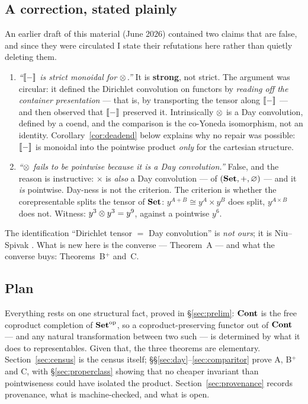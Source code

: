 \subsection*{A correction, stated plainly}
\label{sec:erratum}

An earlier draft of this material (June 2026) contained two claims that are
false, and since they were circulated I state their refutations here rather than
quietly deleting them.

\begin{enumerate}
\item \emph{``$\llbracket - \rrbracket$ is strict monoidal for $\mathbin{\otimes}$.''} It is
  \textbf{strong}, not strict. The argument was circular: it defined the
  Dirichlet convolution on functors by \emph{reading off the container
  presentation} --- that is, by transporting the tensor along $\llbracket - \rrbracket$ --- and
  then observed that $\llbracket - \rrbracket$ preserved it. Intrinsically $\mathbin{\otimes}$ is a Day
  convolution, defined by a coend, and the comparison is the co-Yoneda
  isomorphism, not an identity. Corollary~\ref{cor:deadend} below explains why
  no repair was possible: $\llbracket - \rrbracket$ is monoidal into the pointwise product
  \emph{only} for the cartesian structure.

\item \emph{``$\mathbin{\otimes}$ fails to be pointwise \emph{because} it is a Day
  convolution.''} False, and the reason is instructive: $\times$ is
  \emph{also} a Day convolution --- of $(\mathbf{Set},+,\varnothing)$ --- and it
  \emph{is} pointwise. Day-ness is not the criterion. The criterion is whether
  the corepresentable splits the tensor of $\mathbf{Set}$: $y^{A+B}\cong y^A\times y^B$
  does split, $y^{A\times B}$ does not. Witness: $y^3\mathbin{\otimes} y^3=y^9$, against a
  pointwise $y^6$.
\end{enumerate}

The identification ``Dirichlet tensor $=$ Day convolution'' is \emph{not ours};
it is Niu--Spivak \cite[Prop.~3.79]{NiuSpivak}. What is new here is the converse
--- Theorem~A --- and what the converse buys: Theorems~B$^+$ and~C.

\subsection*{Plan}

Everything rests on one structural fact, proved in §\ref{sec:prelim}: $\mathbf{Cont}$ is
the free coproduct completion of $\mathbf{Set}^{\mathrm{op}}$, so a coproduct-preserving
functor out of $\mathbf{Cont}$ --- and any natural transformation between two such --- is
determined by what it does to representables. Given that, the three theorems are
elementary. Section~\ref{sec:census} is the census itself;
§§\ref{sec:day}--\ref{sec:comparitor} prove A, B$^+$ and C, with
§\ref{sec:properclass} showing that no cheaper invariant than pointwiseness
could have isolated the product. Section~\ref{sec:provenance} records
provenance, what is machine-checked, and what is open.

